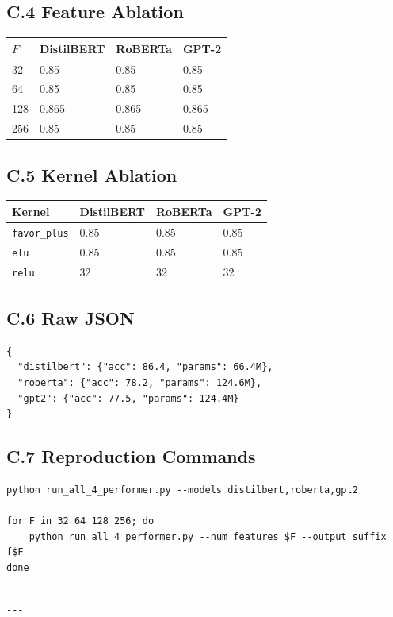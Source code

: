 \subsection{C.4 Feature Ablation}

\begin{table}[H]
\centering
\small
\begin{tabular}{llll}
\toprule
\textbf{$F$} & \textbf{DistilBERT} & \textbf{RoBERTa} & \textbf{GPT-2} \\
\midrule
32 & 0.85 & 0.85 & 0.85 \\
64 & 0.85 & 0.85 & 0.85 \\
128 & 0.865 & 0.865 & 0.865 \\
256 & 0.85 & 0.85 & 0.85 \\
\bottomrule
\end{tabular}
\end{table}

\subsection{C.5 Kernel Ablation}

\begin{table}[H]
\centering
\small
\begin{tabular}{llll}
\toprule
\textbf{Kernel} & \textbf{DistilBERT} & \textbf{RoBERTa} & \textbf{GPT-2} \\
\midrule
\texttt{favor\_plus} & 0.85 & 0.85 & 0.85 \\
\texttt{elu} & 0.85 & 0.85 & 0.85 \\
\texttt{relu} & 32 & 32 & 32 \\
\bottomrule
\end{tabular}
\end{table}

\subsection{C.6 Raw JSON}

\begin{lstlisting}
{
  "distilbert": {"acc": 86.4, "params": 66.4M},
  "roberta": {"acc": 78.2, "params": 124.6M},
  "gpt2": {"acc": 77.5, "params": 124.4M}
}
\end{lstlisting}

\subsection{C.7 Reproduction Commands}

\begin{lstlisting}
python run_all_4_performer.py --models distilbert,roberta,gpt2

for F in 32 64 128 256; do
    python run_all_4_performer.py --num_features $F --output_suffix f$F
done
\end{lstlisting}
\begin{lstlisting}

---
\end{lstlisting}